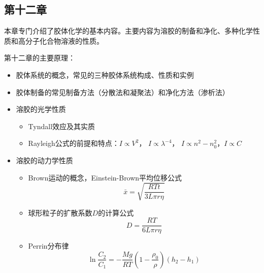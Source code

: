 \documentclass[9pt]{beamer}
\begin{document}
	\subsection{第十二章}
	\begin{frame}
	
	{\color{blue}本章专门介绍了胶体化学的基本内容。主要内容为溶胶的制备和净化、多种化学性质和高分子化合物溶液的性质。}
	
	第十二章的主要原理：	
	
	\begin{itemize}
	
	\item 胶体系统的概念，常见的三种胶体系统构成、性质和实例
	
	\item 胶体制备的常见制备方法（分散法和凝聚法）和净化方法（渗析法）
	
	\item 溶胶的光学性质
		\begin{itemize}
	
		\item Tyndall效应及其实质
	
		\item Rayleigh公式的前提和特点：$I \propto V^2$， $I \propto \lambda^{-4}$， $I \propto n^2-n^2_0 $，$I \propto C$
	
		\end{itemize}		
	
	\item 溶胶的动力学性质
		\begin{itemize}
		
		\item Brown运动的概念，Einstein-Brown平均位移公式
		\[
			\bar x = \sqrt{ \frac{ RTt }{ 3L\pi r \eta } }
		\]
		
		\item 球形粒子的扩散系数$D$的计算公式
		\[
			D = \frac{ RT }{ 6L\pi r \eta }
		\]
		
		\item Perrin分布律
		\[
			\ln{ \frac{ C_2 }{ C_1 } } = - \frac{ Mg }{ RT } \left( 1 - \frac{ \rho_0 }{ \rho } \right) ( h_2 - h_1 )
		\]
		
		\end{itemize}
	
	\end{itemize}
	
	\end{frame}
	
\end{document}
